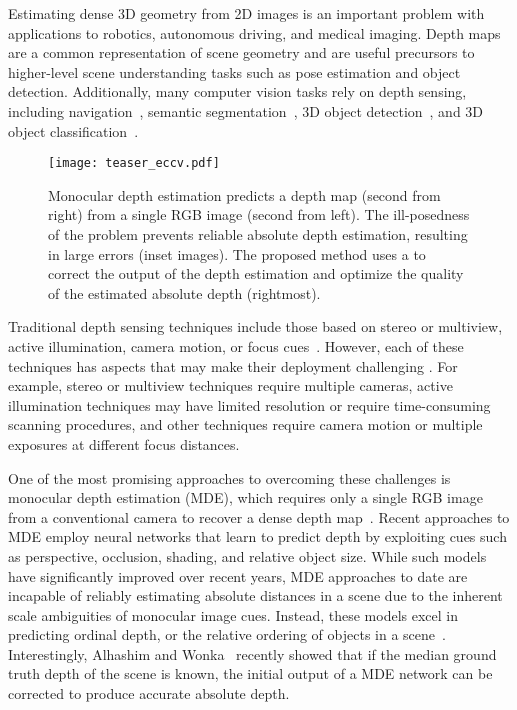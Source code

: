 Estimating dense 3D geometry from 2D images is an important problem with
applications to robotics, autonomous driving, and medical imaging. Depth maps
are a common representation of scene geometry and are useful precursors to
higher-level scene understanding tasks such as pose estimation and object
detection. Additionally, many computer vision tasks rely on depth sensing,
including navigation~\cite{geiger2013vision}, semantic
segmentation~\cite{gupta2013perceptual,ren2012rgb,silberman2012indoor}, 3D
object
detection~\cite{gupta2014learning,lin2013holistic,shrivastava2013building,song2014sliding,song2016deep},
and 3D object
classification~\cite{maturana2015voxnet,qi2016volumetric,wu20153d}.

\begin{figure}[t]
  \centering
  \texttt{[image: teaser\_eccv.pdf]}
  \caption{Monocular depth estimation predicts a depth map (second from right) from a
    single RGB image (second from left). The ill-posedness of the problem prevents
    reliable absolute depth estimation, resulting in large errors (inset images).
    The proposed method uses a  to correct
    the output of the depth estimation and optimize the quality of the
    estimated absolute depth (rightmost).}
  \label{fig:teaser}
\end{figure}

Traditional depth sensing techniques include those based on stereo or multiview,
active illumination, camera motion, or focus cues~\cite{szeliski2010computer}.
However, each of these techniques has aspects that may make their deployment
challenging . For example, stereo or multiview techniques require multiple
cameras, active illumination techniques may have limited resolution or require
time-consuming scanning procedures, and other techniques require camera motion
or multiple exposures at different focus distances.


One of the most promising approaches to overcoming these challenges is monocular
depth estimation (MDE), which requires only a single RGB image from a
conventional camera to recover a dense depth
map~\cite{Alhashim2018,Eigen2014,Fu2018,Laina2016,Saxena2006}. Recent approaches
to MDE employ neural networks that learn to predict depth by exploiting
 cues such as perspective, occlusion, shading, and relative
object size. While such models have significantly improved over recent years,
MDE approaches to date are incapable of reliably estimating absolute distances
in a scene due to the inherent scale ambiguities of monocular image cues.
Instead, these models excel in predicting ordinal depth, or the relative
ordering of objects in a scene~\cite{Eigen2014,Fu2018}. Interestingly, Alhashim
and Wonka~\cite{Alhashim2018} recently showed that if the median ground truth
depth of the scene is known, the initial output of a MDE network can be
corrected to produce accurate absolute depth.


